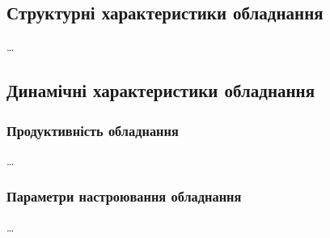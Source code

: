 \startAppendix

\label{add:addon1}

\subsection*{Структурні характеристики обладнання}
\ldots

\subsection*{Динамічні характеристики обладнання}
\subsubsection*{Продуктивність обладнання}
\ldots

\subsubsection*{Параметри настроювання обладнання}
\ldots

